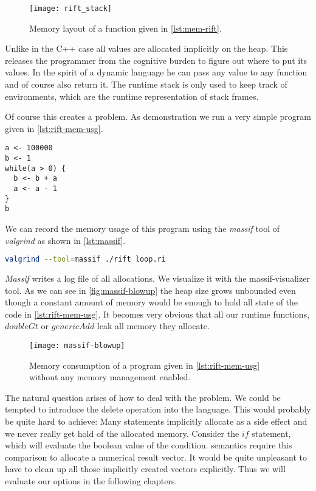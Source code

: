 \begin{figure}[h]
\centering
\texttt{[image: rift\_stack]}
\caption{Memory layout of a \rift function given in \autoref{lst:mem-rift}.}
\label{fig:rift_stack}
\end{figure}

Unlike in the C++ case all \rift values are allocated implicitly on the heap. This releases the programmer from the cognitive burden to figure out where to put its values. In the spirit of a dynamic language he can pass any value to any function and of course also return it. The runtime stack is only used to keep track of environments, which are the runtime representation of \rift stack frames.

Of course this creates a problem. As demonstration we run a very simple \rift program given in \autoref{lst:rift-mem-usg}. 

\begin{lstlisting}[language=rift, caption={loop.ri}, label={lst:rift-mem-usg}]
a <- 100000
b <- 1
while(a > 0) {
  b <- b + a
  a <- a - 1
}
b
\end{lstlisting}

We can record the memory usage of this program using the \emph{massif} tool of \emph{valgrind} as shown in \autoref{lst:massif}.

\begin{lstlisting}[language=bash, label={lst:massif}]
valgrind --tool=massif ./rift loop.ri
\end{lstlisting}

\emph{Massif} writes a log file of all allocations. We visualize it with the massif-visualizer tool. As we can see in \autoref{fig:massif-blowup} the heap size grows unbounded even though a constant amount of memory would be enough to hold all state of the code in \autoref{lst:rift-mem-usg}. It becomes very obvious that all our runtime functions, \eg $doubleGt$ or $genericAdd$ leak all memory they allocate.

\begin{figure}[h]
\centering
\texttt{[image: massif-blowup]}
\caption{Memory consumption of a \rift program given in \autoref{lst:rift-mem-usg} without any memory management enabled.}
\label{fig:massif-blowup}
\end{figure}

The natural question arises of how to deal with the problem. We could be tempted to introduce the delete operation into the \rift language. This would probably be quite hard to achieve: Many \rift statements implicitly allocate as a side effect and we never really get hold of the allocated memory. Consider \eg the $if$ statement, which will evaluate the boolean value of the condition. \Rift semantics require this comparison to allocate a numerical result vector. It would be quite unpleasant to have to clean up all those implicitly created vectors explicitly. Thus we will evaluate our options in the following chapters.


